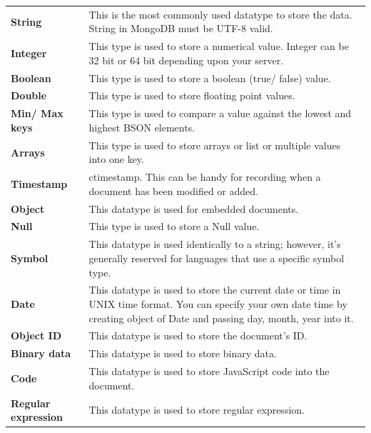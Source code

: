 \documentclass[12pt]{article}
\begin{document}
  \begin{tabular}{lp{24em}}
    \bfseries String & This is the most commonly used datatype to store the
    data. String in MongoDB must be UTF-8 valid. \\

    \bfseries Integer & This type is used to store a numerical value. Integer
    can be 32 bit or 64 bit depending upon your server. \\

    \bfseries Boolean & This type is used to store a boolean (true/ false) value. \\

    \bfseries Double & This type is used to store floating point values. \\

    \bfseries Min/ Max keys & This type is used to compare a value against the
    lowest and highest BSON elements. \\

    \bfseries Arrays & This type is used to store arrays or list or multiple
    values into one key. \\

    \bfseries Timestamp & ctimestamp. This can be handy for recording when a
    document has been modified or added. \\

    \bfseries Object & This datatype is used for embedded documents. \\

    \bfseries Null & This type is used to store a Null value. \\

    \bfseries Symbol & This datatype is used identically to a string; however,
    it's generally reserved for languages that use a specific symbol
    type. \\

    \bfseries Date & This datatype is used to store the current date or time in
    UNIX time format. You can specify your own date time by creating
    object of Date and passing day, month, year into it. \\

    \bfseries Object ID & This datatype is used to store the document’s ID. \\
    \bfseries Binary data & This datatype is used to store binary data. \\
    \bfseries Code & This datatype is used to store JavaScript code into the document. \\
    \bfseries Regular expression & This datatype is used to store regular expression. \\
\end{tabular}
\end{document}
